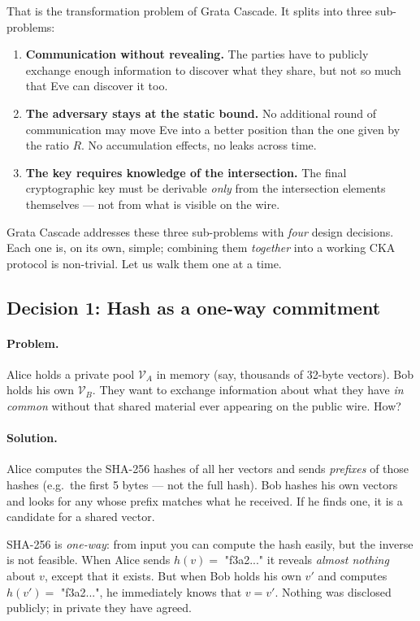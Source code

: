 \documentclass[11pt,a4paper]{article}
\begin{document}
That is the transformation problem of Grata Cascade. It splits into three sub-problems:

\begin{enumerate}[leftmargin=*]
\item \textbf{Communication without revealing.} The parties have to publicly exchange enough information to discover what they share, but not so much that Eve can discover it too.
\item \textbf{The adversary stays at the static bound.} No additional round of communication may move Eve into a better position than the one given by the ratio $R$. No accumulation effects, no leaks across time.
\item \textbf{The key requires knowledge of the intersection.} The final cryptographic key must be derivable \emph{only} from the intersection elements themselves --- not from what is visible on the wire.
\end{enumerate}

Grata Cascade addresses these three sub-problems with \emph{four} design decisions. Each one is, on its own, simple; combining them \emph{together} into a working CKA protocol is non-trivial. Let us walk them one at a time.

\subsection{Decision 1: Hash as a one-way commitment}\label{pop:design-hash}

\paragraph{Problem.} Alice holds a private pool $\mathcal{V}_A$ in memory (say, thousands of 32-byte vectors). Bob holds his own $\mathcal{V}_B$. They want to exchange information about what they have \emph{in common} without that shared material ever appearing on the public wire. How?

\paragraph{Solution.} Alice computes the SHA-256 hashes of all her vectors and sends \emph{prefixes} of those hashes (e.g.\ the first 5 bytes --- not the full hash). Bob hashes his own vectors and looks for any whose prefix matches what he received. If he finds one, it is a candidate for a shared vector.

\begin{aha}
SHA-256 is \emph{one-way}: from input you can compute the hash easily, but the inverse is not feasible. When Alice sends $h(v) = $ "f3a2..." it reveals \emph{almost nothing} about $v$, except that it exists. But when Bob holds his own $v'$ and computes $h(v') = $ "f3a2...", he immediately knows that $v = v'$. Nothing was disclosed publicly; in private they have agreed.
\end{aha}
\end{document}
